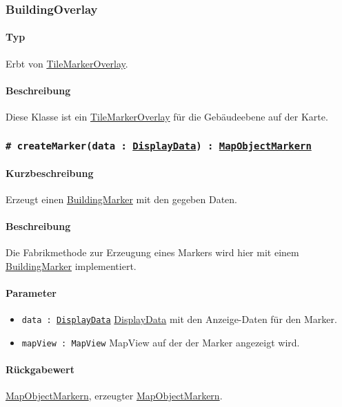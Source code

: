 \subsubsection{BuildingOverlay}
\paragraph*{Typ}
Erbt von \hyperref[App_Map_View_TileMarkerOverlay]{TileMarkerOverlay}.
\paragraph*{Beschreibung}
Diese Klasse ist ein \hyperref[App_Map_View_TileMarkerOverlay]{TileMarkerOverlay} für die Gebäudeebene auf der Karte.

\subsubsection*{\texttt{\# createMarker(data : \hyperref[App_Map_Util_DisplayData]{DisplayData}) : \hyperref[App_Map_View_MapObjectMarker]{MapObjectMarkern}}}%
\paragraph*{Kurzbeschreibung}
Erzeugt einen \hyperref[App_Map_View_BuildingMarker]{BuildingMarker} mit den gegeben Daten.
\paragraph*{Beschreibung}
Die Fabrikmethode zur Erzeugung eines Markers wird hier mit einem \hyperref[App_Map_View_BuildingMarker]{BuildingMarker} implementiert.
\paragraph*{Parameter}
\begin{itemize}
    \item \texttt{data : \hyperref[App_Map_Util_DisplayData]{DisplayData}} \hyperref[App_Map_Util_DisplayData]{DisplayData} mit den Anzeige-Daten für den Marker.
    \item \texttt{mapView : MapView} MapView auf der der Marker angezeigt wird.
\end{itemize}
\paragraph*{Rückgabewert}
\hyperref[App_Map_View_MapObjectMarker]{MapObjectMarkern}, erzeugter \hyperref[App_Map_View_MapObjectMarker]{MapObjectMarkern}.

